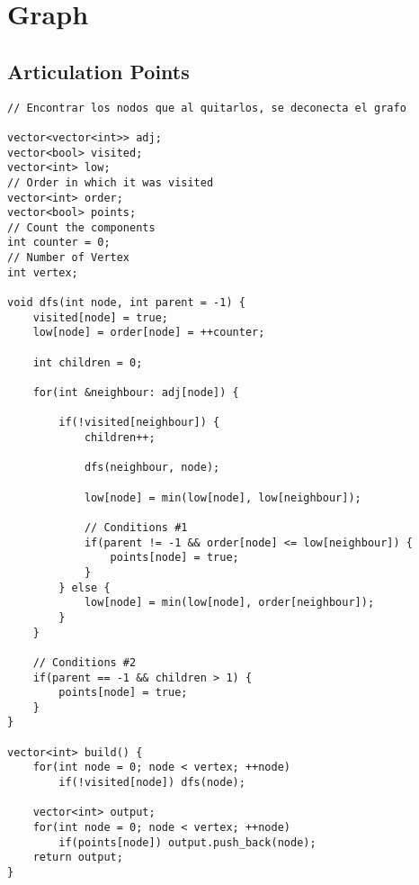 \documentclass[10pt,letterpaper,twocolumn,twosided]{article}
\begin{document}
\section{Graph}

\subsection{Articulation Points}
\begin{lstlisting}
// Encontrar los nodos que al quitarlos, se deconecta el grafo

vector<vector<int>> adj;
vector<bool> visited;
vector<int> low;
// Order in which it was visited
vector<int> order;
vector<bool> points;
// Count the components
int counter = 0;
// Number of Vertex
int vertex;

void dfs(int node, int parent = -1) {
    visited[node] = true;
    low[node] = order[node] = ++counter;

    int children = 0;

    for(int &neighbour: adj[node]) {

        if(!visited[neighbour]) {
            children++;

            dfs(neighbour, node);

            low[node] = min(low[node], low[neighbour]);
            
            // Conditions #1
            if(parent != -1 && order[node] <= low[neighbour]) {
                points[node] = true;
            }
        } else {
            low[node] = min(low[node], order[neighbour]);
        }
    }
    
    // Conditions #2
    if(parent == -1 && children > 1) {
        points[node] = true;
    }
}

vector<int> build() {
    for(int node = 0; node < vertex; ++node)
        if(!visited[node]) dfs(node);
    
    vector<int> output;
    for(int node = 0; node < vertex; ++node)
        if(points[node]) output.push_back(node);
    return output;
}
\end{lstlisting}
\end{document}
